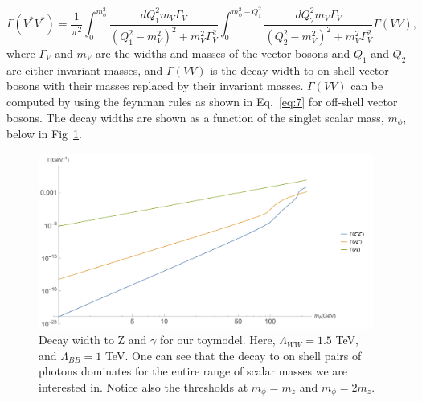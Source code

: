 \documentclass[aps,onecolumn,twoside,secnumarabic,balancelastpage,amsmath,amssymb,nofootinbib,hyperref=pdftex]{revtex4}
\begin{document}
\begin{equation}
\Gamma(V^{*}V^{*}) = \frac{1}{\pi^{2}} \int^{m_{\phi}^{2}}_{0} \frac{dQ_{1}^{2}m_{V}\Gamma_{V}}{(Q_{1}^{2} - m_{V}^{2})^{2} + m_{V}^{2}\Gamma_{V}^{2}} \int^{m_{\phi}^{2} - Q_{1}^{2}}_{0} \frac{dQ_{2}^{2}m_{V}\Gamma_{V}}{(Q_{2}^{2} - m_{V}^{2})^{2} + m_{V}^{2}\Gamma_{V}^{2}}\Gamma(VV),
\end{equation}
where $\Gamma_{V}$ and $m_{V}$ are the widths and masses of the vector bosons and $Q_{1}$ and $Q_{2}$ are either invariant masses, and $\Gamma(VV)$ is the decay width to on shell vector bosons with their masses replaced by their invariant masses.
\vskip 0.12in
$\Gamma(VV)$ can be computed by using the feynman rules as shown in Eq.~\ref{eq:7} for off-shell vector bosons. The decay widths are shown as a function of the singlet scalar mass, $m_{\phi}$, below in Fig~\ref{fig:offshell_lifetime}. 
\begin{figure}[htbp]
\begin{center}
\includegraphics[width=11cm]{offshell_lifetime.png}
\caption{Decay width to Z and $\gamma$ for our toymodel. Here, $\Lambda_{WW} = 1.5$ TeV, and $\Lambda_{BB} = 1$ TeV. One can see that the decay to on shell pairs of photons dominates for the entire range of scalar masses we are interested in. Notice also the thresholds at $m_{\phi} = m_{z}$ and $m_{\phi} = 2 m_{z}$.}
\label{fig:offshell_lifetime}
\end{center}
\end{figure}
\end{document}
